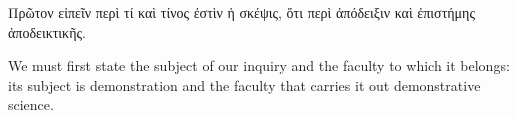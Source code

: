 \documentclass[a4paper]{book}
\begin{document}
\begin{pages}
\begin{greek}
\begin{Leftside}
\beginnumbering
\pstart
Πρῶτον εἰπεῖν περὶ τί καὶ τίνος ἐστὶν ἡ σκέψις, ὅτι περὶ ἀπόδειξιν καὶ ἐπιστήμης ἀποδεικτικῆς.
\pend
\endnumbering
\end{Leftside}
\end{greek}


\begin{Rightside}
\beginnumbering
\pstart
We must first state the subject of our inquiry and the faculty to which it belongs: its subject is demonstration and the faculty that carries it out demonstrative science.
\pend
\endnumbering
\end{Rightside}
\end{pages}
\Pages
\end{document}
